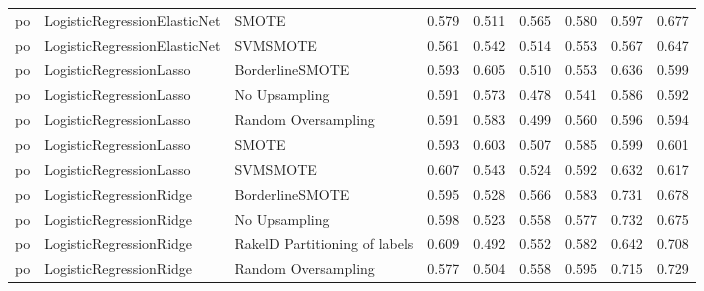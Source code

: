 \begin{tabular}{lllllllll}
      po &    LogisticRegressionElasticNet &                         SMOTE & 0.579 &                     0.511 &                 0.565 &                  0.580 &                                   0.597 &     0.677 \\
      po &    LogisticRegressionElasticNet &                      SVMSMOTE & 0.561 &                     0.542 &                 0.514 &                  0.553 &                                   0.567 &     0.647 \\
      po &         LogisticRegressionLasso &               BorderlineSMOTE & 0.593 &                     0.605 &                 0.510 &                  0.553 &                                   0.636 &     0.599 \\
      po &         LogisticRegressionLasso &                 No Upsampling & 0.591 &                     0.573 &                 0.478 &                  0.541 &                                   0.586 &     0.592 \\
      po &         LogisticRegressionLasso &           Random Oversampling & 0.591 &                     0.583 &                 0.499 &                  0.560 &                                   0.596 &     0.594 \\
      po &         LogisticRegressionLasso &                         SMOTE & 0.593 &                     0.603 &                 0.507 &                  0.585 &                                   0.599 &     0.601 \\
      po &         LogisticRegressionLasso &                      SVMSMOTE & 0.607 &                     0.543 &                 0.524 &                  0.592 &                                   0.632 &     0.617 \\
      po &         LogisticRegressionRidge &               BorderlineSMOTE & 0.595 &                     0.528 &                 0.566 &                  0.583 &                                   0.731 &     0.678 \\
      po &         LogisticRegressionRidge &                 No Upsampling & 0.598 &                     0.523 &                 0.558 &                  0.577 &                                   0.732 &     0.675 \\
      po &         LogisticRegressionRidge & RakelD Partitioning of labels & 0.609 &                     0.492 &                 0.552 &                  0.582 &                                   0.642 &     0.708 \\
      po &         LogisticRegressionRidge &           Random Oversampling & 0.577 &                     0.504 &                 0.558 &                  0.595 &                                   0.715 &     0.729 \\

\end{tabular}

